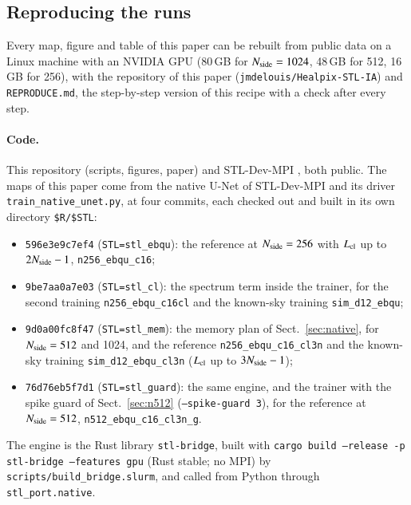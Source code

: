 \documentclass{aa}
\newcommand{\nside}{N_{\rm side}}
\begin{document}
\begin{appendix}
\section{Reproducing the runs}\label{app:repro}

Every map, figure and table of this paper can be rebuilt from public data on a Linux machine with an NVIDIA GPU (80\,GB for $\nside=1024$, 48\,GB for 512, 16\,GB for 256), with the repository of this paper (\texttt{jmdelouis/Healpix-STL-IA}) and \texttt{REPRODUCE.md}, the step-by-step version of this recipe with a check after every step.

\paragraph{Code.} This repository (scripts, figures, paper) and STL-Dev-MPI \citep{stldev}, both public. The maps of this paper come from the native U-Net of STL-Dev-MPI and its driver \texttt{train\_native\_unet.py}, at four commits, each checked out and built in its own directory \texttt{\$R/\$STL}:
\begin{itemize}
  \item \texttt{596e3e9c7ef4} (\texttt{STL=stl\_ebqu}): the reference at $\nside=256$ with $L_{\rm cl}$ up to $2\nside-1$, \texttt{n256\_ebqu\_c16};
  \item \texttt{9be7aa0a7e03} (\texttt{STL=stl\_cl}): the spectrum term inside the trainer, for the second training \texttt{n256\_ebqu\_c16cl} and the known-sky training \texttt{sim\_d12\_ebqu};
  \item \texttt{9d0a00fc8f47} (\texttt{STL=stl\_mem}): the memory plan of Sect.~\ref{sec:native}, for $\nside=512$ and 1024, and the reference \texttt{n256\_ebqu\_c16\_cl3n} and the known-sky training \texttt{sim\_d12\_ebqu\_cl3n} ($L_{\rm cl}$ up to $3\nside-1$);
  \item \texttt{76d76eb5f7d1} (\texttt{STL=stl\_guard}): the same engine, and the trainer with the spike guard of Sect.~\ref{sec:n512} (\texttt{--spike-guard 3}), for the reference at $\nside=512$, \texttt{n512\_ebqu\_c16\_cl3n\_g}.
\end{itemize}
The engine is the Rust library \texttt{stl-bridge}, built with \texttt{cargo build --release -p stl-bridge --features gpu} (Rust stable; no MPI) by \texttt{scripts/build\_bridge.slurm}, and called from Python through \texttt{stl\_port.native}.


\end{appendix}
\end{document}
